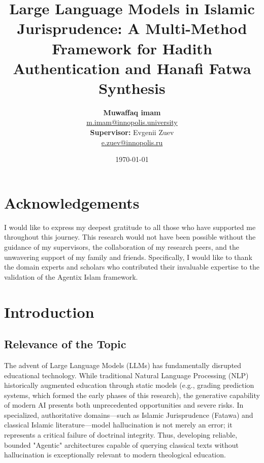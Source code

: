 \documentclass[12pt, a4paper]{report}
\title{\textbf{Large Language Models in Islamic Jurisprudence: A Multi-Method Framework for Hadith Authentication and Hanafi Fatwa Synthesis}}
\author{\textbf{Muwaffaq imam} \\ \href{mailto:m.imam@innopolis.university}{m.imam@innopolis.university} \\ \vspace{0.5cm} \textbf{Supervisor:} Evgenii Zuev \\ \href{mailto:e.zuev@innopolis.ru}{e.zuev@innopolis.ru}}
\date{\today}
\begin{document}
\begin{titlepage}
\thispagestyle{empty}
\maketitle
\end{titlepage}
\setcounter{page}{2}

\chapter*{Acknowledgements}
I would like to express my deepest gratitude to all those who have supported me throughout this journey. This research would not have been possible without the guidance of my supervisors, the collaboration of my research peers, and the unwavering support of my family and friends. Specifically, I would like to thank the domain experts and scholars who contributed their invaluable expertise to the validation of the Agentix Islam framework.

\tableofcontents
\newpage

\chapter{Introduction}

\section{Relevance of the Topic}
The advent of Large Language Models (LLMs) has fundamentally disrupted educational technology. While traditional Natural Language Processing (NLP) historically augmented education through static models (e.g., grading prediction systems, which formed the early phases of this research), the generative capability of modern AI presents both unprecedented opportunities and severe risks. In specialized, authoritative domains—such as Islamic Jurisprudence (Fatawa) and classical Islamic literature—model hallucination is not merely an error; it represents a critical failure of doctrinal integrity. Thus, developing reliable, bounded "Agentic" architectures capable of querying classical texts without hallucination is exceptionally relevant to modern theological education.
\end{document}
